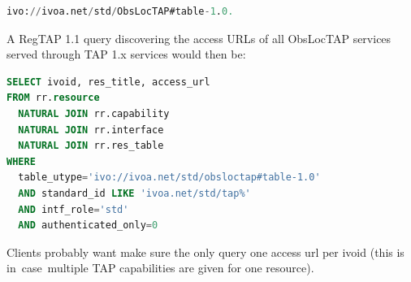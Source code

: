 \documentclass[11pt,a4paper]{ivoa}
\begin{document}
\begin{lstlisting}[language=SQL]
ivo://ivoa.net/std/ObsLocTAP#table-1.0.
\end{lstlisting}

A RegTAP 1.1 query discovering the access URLs of all ObsLocTAP services served
through TAP 1.x services would then be:

\begin{lstlisting}[language=SQL]
SELECT ivoid, res_title, access_url
FROM rr.resource
  NATURAL JOIN rr.capability
  NATURAL JOIN rr.interface
  NATURAL JOIN rr.res_table
WHERE
  table_utype='ivo://ivoa.net/std/obsloctap#table-1.0'
  AND standard_id LIKE 'ivoa.net/std/tap%'
  AND intf_role='std'
  AND authenticated_only=0
\end{lstlisting}
Clients probably want make sure the only query one access url per ivoid
(this is in\ case\ multiple TAP capabilities are given for one resource).
\par
\end{document}
